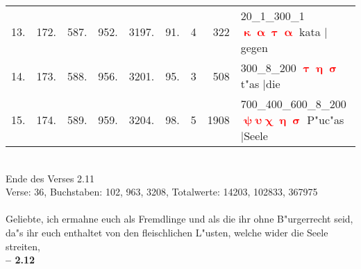 \documentclass[a4paper,10pt,landscape]{article}
\begin{document}
\begin{tabular}{rrrrrrrrp{120mm}}
13.&172.&587.&952.&3197.&91.&4&322&20\_1\_300\_1 \textcolor{red}{$\boldsymbol{\upkappa\upalpha\uptau\upalpha}$} kata $|$gegen\\
14.&173.&588.&956.&3201.&95.&3&508&300\_8\_200 \textcolor{red}{$\boldsymbol{\uptau\upeta\upsigma}$} t"as $|$die\\
15.&174.&589.&959.&3204.&98.&5&1908&700\_400\_600\_8\_200 \textcolor{red}{$\boldsymbol{\uppsi\upsilon\upchi\upeta\upsigma}$} P"uc"as $|$Seele\\
\end{tabular}\medskip \\
Ende des Verses 2.11\\
Verse: 36, Buchstaben: 102, 963, 3208, Totalwerte: 14203, 102833, 367975\\
\\
Geliebte, ich ermahne euch als Fremdlinge und als die ihr ohne B"urgerrecht seid, da"s ihr euch enthaltet von den fleischlichen L"usten, welche wider die Seele streiten,\\
\newpage 
{\bf -- 2.12}\\
\medskip \\
\end{document}
